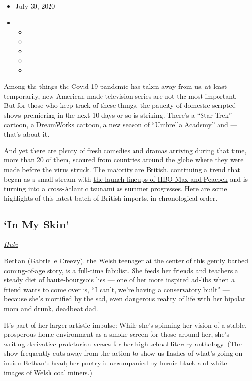 \begin{itemize}
\item
  July 30, 2020
\item
  \begin{itemize}
  \item
  \item
  \item
  \item
  \item
  \end{itemize}
\end{itemize}

Among the things the Covid-19 pandemic has taken away from us, at least
temporarily, new American-made television series are not the most
important. But for those who keep track of these things, the paucity of
domestic scripted shows premiering in the next 10 days or so is
striking. There's a ``Star Trek'' cartoon, a DreamWorks cartoon, a new
season of ``Umbrella Academy'' and --- that's about it.

And yet there are plenty of fresh comedies and dramas arriving during
that time, more than 20 of them, scoured from countries around the globe
where they were made before the virus struck. The majority are British,
continuing a trend that began as a small stream with
\href{https://www.nytimes.com/2020/07/15/arts/television/capture-intelligence-review-peacock.html}{the
launch lineups of HBO Max and Peacock} and is turning into a
cross-Atlantic tsunami as summer progresses. Here are some highlights of
this latest batch of British imports, in chronological order.

\hypertarget{in-my-skin}{%
\subsection{`In My Skin'}\label{in-my-skin}}

\href{https://www.hulu.com/series/in-my-skin-91be18aa-30c6-40bf-b191-74503708b305}{\emph{Hulu}}

Bethan (Gabrielle Creevy), the Welsh teenager at the center of this
gently barbed coming-of-age story, is a full-time fabulist. She feeds
her friends and teachers a steady diet of haute-bourgeois lies --- one
of her more inspired ad-libs when a friend wants to come over is, ``I
can't, we're having a conservatory built'' --- because she's mortified
by the sad, even dangerous reality of life with her bipolar mom and
drunk, deadbeat dad.

It's part of her larger artistic impulse: While she's spinning her
vision of a stable, prosperous home environment as a smoke screen for
those around her, she's writing derivative proletarian verses for her
high school literary anthology. (The show frequently cuts away from the
action to show us flashes of what's going on inside Bethan's head; her
poetry is accompanied by heroic black-and-white images of Welsh coal
miners.)

